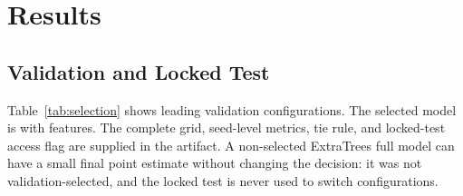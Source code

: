 \documentclass[conference]{IEEEtran}
\begin{document}
\begin{table}[t]
\centering
\caption{Fixed gate policy. Gate A and Gate B are independent; machine-readable
values are in \texttt{configs/fidelity\_gate.yaml}.}
\label{tab:gate}
\scriptsize
\resizebox{\columnwidth}{!}{}
\end{table}

\begin{center}
\end{center}

\section{Results}
\subsection{Validation and Locked Test}
Table~\ref{tab:selection} shows leading validation configurations. The selected
model is \AuditSelectedModel{} with \AuditSelectedFamily{} features. The complete
grid, seed-level metrics, tie rule, and locked-test access flag are supplied in the
artifact. A non-selected ExtraTrees full model can have a small final point estimate
without changing the decision: it was not validation-selected, and the locked test
is never used to switch configurations.

\begin{table}[t]
\centering
\caption{Validation selection on 2012--2015. RMSE is computed after fixed-seed
prediction aggregation; Seed SD is the across-seed RMSE standard deviation.}
\label{tab:selection}
\scriptsize
\resizebox{\columnwidth}{!}{}
\end{table}
\end{document}
